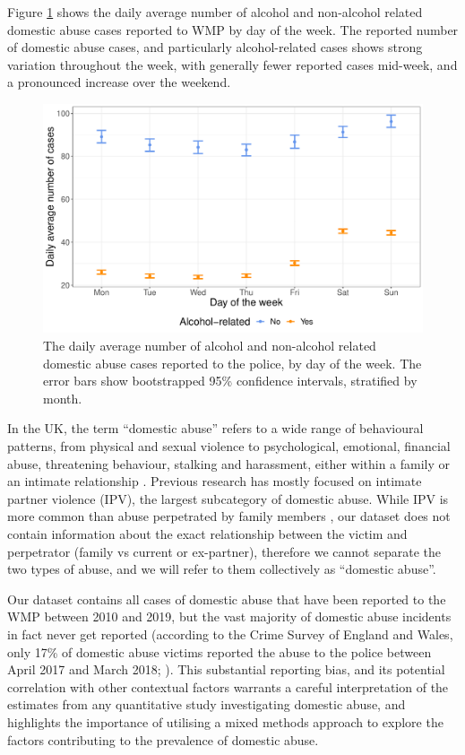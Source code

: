 \documentclass[12pt, a4paper]{article}
\begin{document}
Figure \ref{fig:descriptive} shows the daily average number of alcohol and non-alcohol related domestic abuse cases reported to WMP by day of the week. The reported number of domestic abuse cases, and particularly alcohol-related cases shows strong variation throughout the week, with generally fewer reported cases mid-week, and a pronounced increase over the weekend. 

\begin{figure} 
\begin{center} 
\includegraphics[scale = 0.6]{descriptives.pdf}
\caption{The daily average number of alcohol and non-alcohol related domestic abuse cases reported to the police, by day of the week. The error bars show bootstrapped 95\% confidence intervals, stratified by month. \label{fig:descriptive}} 
\end{center} 
\end{figure} 

In the UK, the term ``domestic abuse'' refers to a wide range of behavioural patterns, from physical and sexual violence to psychological, emotional, financial abuse, threatening behaviour, stalking and harassment, either within a family or an intimate relationship \cite{ONS}. Previous research has mostly focused on intimate partner violence (IPV), the largest subcategory of domestic abuse. While IPV is more common than abuse perpetrated by family members \cite{ONS}, our dataset does not contain information about the exact relationship between the victim and perpetrator (family vs current or ex-partner), therefore we cannot separate the two types of abuse, and we will refer to them collectively as ``domestic abuse''.


Our dataset contains all cases of domestic abuse that have been reported to the WMP between 2010 and 2019, but the vast majority of domestic abuse incidents in fact never get reported (according to the Crime Survey of England and Wales, only 17\% of domestic abuse victims reported the abuse to the police between April 2017 and March 2018; ). This substantial reporting bias, and its potential correlation with other contextual factors warrants a careful interpretation of the estimates from any quantitative study investigating domestic abuse, and highlights the importance of utilising a mixed methods approach to explore the factors contributing to the prevalence of domestic abuse. 
  
\end{document}
